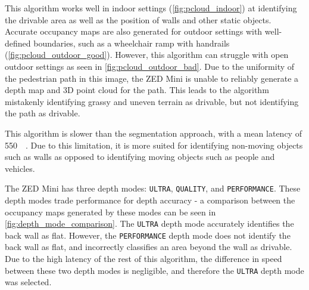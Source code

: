 This algorithm works well in indoor settings (\cref{fig:pcloud_indoor}) at identifying the drivable area
as well as the position of walls and other static objects. Accurate occupancy maps are also generated for
outdoor settings with well-defined boundaries, such as a wheelchair ramp with handrails (\cref{fig:pcloud_outdoor_good}).
However, this algorithm can struggle with open outdoor settings as seen in \cref{fig:pcloud_outdoor_bad}.
Due to the uniformity of the pedestrian path in this image, the ZED Mini is unable to
reliably generate a depth map and 3D point cloud for the path. This leads to the algorithm
mistakenly identifying grassy and uneven terrain as drivable, but not identifying the
path as drivable.

This algorithm is slower than the segmentation approach, with a mean latency of \SI{550}{\milli\seconds}.
Due to this limitation, it is more suited for identifying non-moving objects such as walls
as opposed to identifying moving objects such as people and vehicles.

The ZED Mini has three depth modes: \texttt{ULTRA}, \texttt{QUALITY}, and \texttt{PERFORMANCE}.
These depth modes trade performance for depth accuracy - a comparison between the occupancy maps
generated by these modes can be seen in \cref{fig:depth_mode_comparison}.
The \texttt{ULTRA} depth mode accurately identifies the back wall as flat.
However, the \texttt{PERFORMANCE} depth mode does not identify the back wall
as flat, and incorrectly classifies an area beyond the wall as drivable.
Due to the high latency of the rest of this algorithm, the difference in speed between these two depth modes is negligible,
and therefore the \texttt{ULTRA} depth mode was selected.


